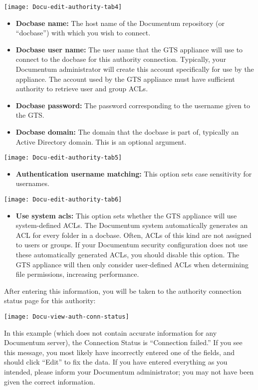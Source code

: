 \texttt{[image: Docu-edit-authority-tab4]}

\begin{itemize}

\item \textbf{Docbase name:} The host name of the Documentum
repository (or ``docbase'') with which you wish to connect.

\item \textbf{Docbase user name:} The user name that the GTS appliance
will use to connect to the docbase for this authority connection.
Typically, your Documentum administrator will create this account
specifically for use by the appliance. The account used by the GTS
appliance must have sufficient authority to retrieve user and group
ACLs.

\item \textbf{Docbase password:} The password corresponding to the
username given to the GTS.

\item \textbf{Docbase domain:} The domain that the docbase is part of,
typically an Active Directory domain. This is an optional argument.

\end{itemize}

\texttt{[image: Docu-edit-authority-tab5]}

\begin{itemize}

\item \textbf{Authentication username matching:} This option sets case
sensitivity for usernames.

\end{itemize}


\texttt{[image: Docu-edit-authority-tab6]}

\begin{itemize}

\item \textbf{Use system acls:} This option sets whether the GTS
appliance will use system-defined ACLs. The Documentum system
automatically generates an ACL for every folder in a docbase. Often,
ACLs of this kind are not assigned to users or groups. If your
Documentum security configuration does not use these automatically
generated ACLs, you should disable this option. The GTS appliance will
then only consider user-defined ACLs when determining file
permissions, increasing performance.

\end{itemize}




After entering this information, you will be taken to the authority
connection status page for this authority:

\texttt{[image: Docu-view-auth-conn-status]}

In this example (which does not contain accurate information for any
Documentum server), the Connection Status is ``Connection failed.''
If you see this message, you most likely have incorrectly entered one
of the fields, and should click ``Edit'' to fix the data. If you have
entered everything as you intended, please inform your Documentum
administrator; you may not have been given the correct information.
